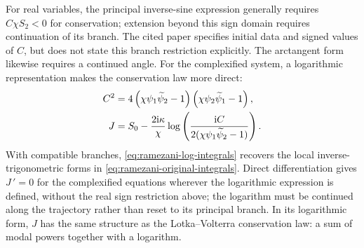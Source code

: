 \documentclass[11pt,a4paper]{article}
\numberwithin{equation}{section}
\begin{document}
For real variables, the principal inverse-sine expression generally requires $C\chi S_2<0$ for conservation; extension beyond this sign domain requires continuation of its branch. The cited paper specifies initial data and signed values of $C$, but does not state this branch restriction explicitly. The arctangent form likewise requires a continued angle. For the complexified system, a logarithmic representation makes the conservation law more direct:
\begin{align}
    C^2
    &=
    4
    \left(
        \chi\psi_1\widetilde{\psi}_2-1
    \right)
    \left(
        \chi\psi_2\widetilde{\psi}_1-1
    \right),
    \notag \\
    J
    &=
    S_0
    -
    \frac{2\mathrm{i}\kappa}{\chi}
    \log\left(
        \frac{\mathrm{i}C}
        {2(\chi\psi_1\widetilde{\psi}_2-1)}
    \right).
    \label{eq:ramezani-log-integrals}
\end{align}
With compatible branches, \eqref{eq:ramezani-log-integrals} recovers the local inverse-trigonometric forms in \eqref{eq:ramezani-original-integrals}. Direct differentiation gives $J\,'=0$ for the complexified equations wherever the logarithmic expression is defined, without the real sign restriction above; the logarithm must be continued along the trajectory rather than reset to its principal branch. In its logarithmic form, $J$ has the same structure as the Lotka--Volterra conservation law: a sum of modal powers together with a logarithm.
\end{document}
